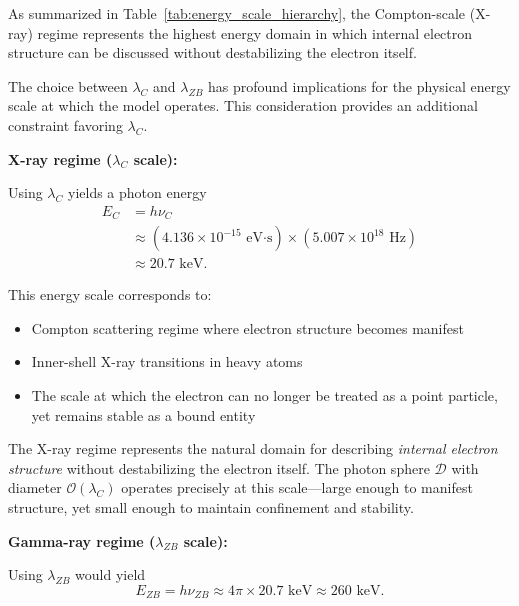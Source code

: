 \documentclass[%
 reprint,
 amsmath,amssymb,
 aps,
 prb,
]{revtex4-2}
\numberwithin{equation}{section}
\begin{document}
As summarized in Table~\ref{tab:energy_scale_hierarchy}, 
the Compton-scale (X-ray) regime represents the highest energy domain 
in which internal electron structure can be discussed 
without destabilizing the electron itself.

The choice between $\lambda_C$ and $\lambda_{ZB}$ has profound implications for the physical energy scale at which the model operates. This consideration provides an additional constraint favoring $\lambda_C$.

\vspace{0.5cm}

\noindent\textbf{X-ray regime ($\lambda_C$ scale):}

\vspace{0.3cm}

Using $\lambda_C$ yields a photon energy
\begin{equation}
\begin{split}
E_C &= h\nu_C  \\
    &\approx (4.136 \times 10^{-15} \text{ eV·s}) \times (5.007 \times 10^{18} \text{ Hz}) \\
    &\approx 20.7 \text{ keV}.
\end{split}
\end{equation}

This energy scale corresponds to:
\begin{itemize}
\item Compton scattering regime where electron structure becomes manifest
\item Inner-shell X-ray transitions in heavy atoms
\item The scale at which the electron can no longer be treated as a point particle, yet remains stable as a bound entity
\end{itemize}

The X-ray regime represents the natural domain for describing \textit{internal electron structure} without destabilizing the electron itself. The photon sphere $\mathcal{D}$ with diameter $\mathcal{O}(\lambda_C)$ operates precisely at this scale—large enough to manifest structure, yet small enough to maintain confinement and stability.

\vspace{1.5cm}

\noindent\textbf{Gamma-ray regime ($\lambda_{ZB}$ scale):}

\vspace{0.3cm}

Using $\lambda_{ZB}$ would yield
\begin{equation}
E_{ZB} = h\nu_{ZB} \approx 4\pi \times 20.7 \text{ keV} \approx 260 \text{ keV}.
\end{equation}
\end{document}

